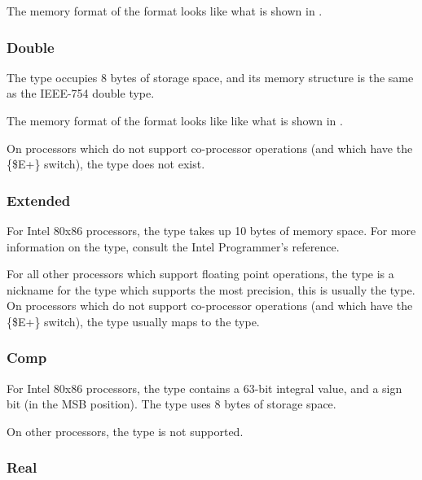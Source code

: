 The memory format of the  format looks like
what is shown in .



\subsubsection{Double}

The  type occupies 8 bytes of storage space,
and its memory structure is the same as the IEEE-754 double
type.

The memory format of the  format looks like
like what is shown in .



On processors which do not support co-processor operations (and which have
the \{\$E+\} switch), the  type does not exist.



\subsubsection{Extended}

For Intel 80x86 processors, the  type takes up 10 bytes of memory space. For more information
on the  type, consult the Intel Programmer's reference.

For all other processors which support floating point operations,
the  type is a nickname for the type which supports
the most precision, this is usually the  type. 
On processors which do not support co-processor operations (and which have
the \{\$E+\} switch), the  type usually maps to the
 type.

\subsubsection{Comp}

For Intel 80x86 processors, the  type contains
a 63-bit integral value, and a sign bit (in the MSB position).
The  type uses 8 bytes of storage space.

On other processors, the  type is not supported.

\subsubsection{Real}


